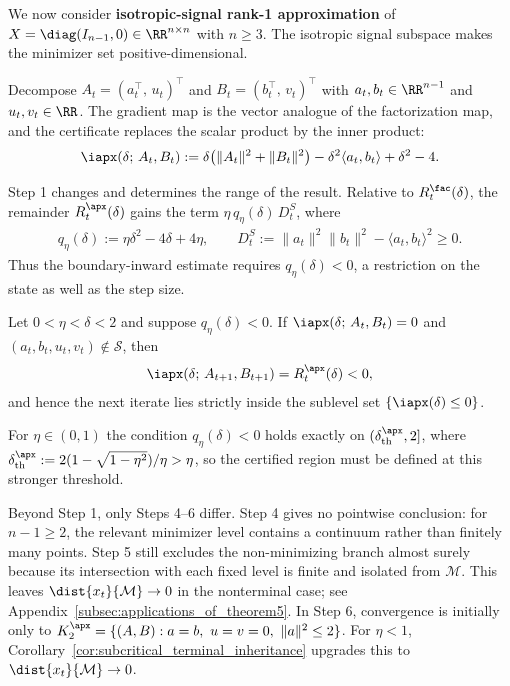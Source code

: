 \documentclass{article}
\begin{document}
We now consider \textbf{isotropic-signal rank-1 approximation} of
$X=\diag(I_{n-1},0)\in\RR^{n\times n}$ with $n\ge3$. The isotropic signal
subspace makes the minimizer set positive-dimensional.

Decompose $A_t = (a_t^\top,\, u_t)^\top$ and $B_t = (b_t^\top,\, v_t)^\top$
with $a_t,b_t\in\RR^{n-1}$ and $u_t,v_t\in\RR$. The gradient map is the vector
analogue of the factorization map, and the certificate replaces the scalar
product by the inner product:
\begin{align}
    \iapx(\delta;\, A_t, B_t)
    := \delta\bigl(\|A_t\|^2 + \|B_t\|^2\bigr)
       - \delta^2 \langle a_t, b_t \rangle + \delta^2 - 4.
\end{align}

Step 1 changes and determines the range of the result. Relative to
$R_t^\fac(\delta)$, the remainder $R_t^\apx(\delta)$ gains the term
$\eta\,q_\eta(\delta)\,D_t^S$, where
\begin{align}
    q_\eta(\delta) := \eta\delta^2 - 4\delta + 4\eta,
    \qquad
    D_t^S := \|a_t\|^2 \|b_t\|^2 - \langle a_t, b_t \rangle^2 \ge 0.
\end{align}
Thus the
boundary-inward estimate requires $q_\eta(\delta)<0$, a restriction on the
state as well as the step size.

\begin{proposition}\label{prop:boundary_inward_rank1_approx}
Let $0 < \eta < \delta < 2$ and suppose $q_\eta(\delta) < 0$.
If $\iapx(\delta;\, A_t, B_t) = 0$ and $(a_t, b_t, u_t, v_t) \notin \mathcal{S}$,
then
\begin{align}
    \iapx(\delta;\, A_{t+1}, B_{t+1}) = R_t^\apx(\delta) < 0,
\end{align}
and hence the next iterate lies strictly inside the sublevel set $\{\iapx(\delta) \le 0\}$.
\end{proposition}

For $\eta\in(0,1)$ the condition $q_\eta(\delta)<0$ holds exactly on
$(\delta_\mathrm{th}^\apx,2]$, where
$\delta_\mathrm{th}^\apx := 2(1-\sqrt{1-\eta^2})/\eta>\eta$, so the certified
region must be defined at this stronger threshold.

Beyond Step 1, only Steps 4--6 differ. Step 4 gives no pointwise conclusion:
for $n-1\ge2$, the relevant minimizer level contains a continuum rather than
finitely many points. Step 5 still excludes the non-minimizing branch almost
surely because its intersection with each fixed level is finite and isolated
from $\mathcal M$. This leaves $\dist{x_t}{\mathcal M}\to0$ in the nonterminal
case; see Appendix~\ref{subsec:applications_of_theorem5}. In Step 6, convergence
is initially only to
$K_2^\apx=\{(A,B):a=b,\ u=v=0,\ \|a\|^2\le2\}$. For $\eta<1$,
Corollary~\ref{cor:subcritical_terminal_inheritance} upgrades this to
$\dist{x_t}{\mathcal M}\to0$.
\end{document}
